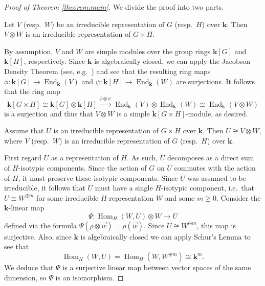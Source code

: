 \documentclass[11pt]{article}
\newenvironment{claim}[1]
 {\renewcommand\theclaimx{#1}\claimx}
 {\endclaimx}
\numberwithin{equation}{section}
\theoremstyle{plain}
\theoremstyle{definition}
\DeclareMathOperator{\Hom}{Hom}
\DeclareMathOperator{\End}{End}
\newcommand\bk{\ensuremath{\mathbf{k}}}
\begin{document}
\begin{proof}[Proof of Theorem \ref{theorem:main}]
We divide the proof into two parts.

\begin{claim}{1}
Let $V$ (resp.\ $W$) be an irreducible representation of $G$ (resp.\ $H$) over $\bk$.  Then
$V \otimes W$ is an irreducible representation of $G \times H$. 
\end{claim}

By assumption, $V$ and $W$ are simple modules over the group rings
$\bk[G]$ and $\bk[H]$, respectively.  
Since $\bk$ is algebraically closed, we can apply the Jacobson Density Theorem 
(see, e.g.\ \cite{PutmanDensity})
and see that the resulting ring maps
$\phi\colon \bk[G] \rightarrow \End_{\bk}(V)$ and $\psi\colon \bk[H] \rightarrow \End_{\bk}(W)$ 
are surjections.  It follows that the ring map
\[\bk[G \times H] \cong \bk[G] \otimes \bk[H] \stackrel{\phi \otimes \psi}{\longrightarrow} \End_{\bk}(V) \otimes \End_{\bk}(W) \cong \End_{\bk}(V \otimes W)\]
is a surjection and thus that $V \otimes W$ is a simple $\bk[G \times H]$-module, as desired.

\begin{claim}{2}
Assume that $U$ is an irreducible representation of $G \times H$ over $\bk$.  
Then $U \cong V \otimes W$, where $V$ (resp.\ $W$) is an irreducible representation
of $G$ (resp.\ $H$) over $\bk$.
\end{claim}

First regard $U$ as a representation of $H$.  As such, $U$ decomposes as a direct sum
of $H$-isotypic components.  Since the action of $G$ on $U$ commutes with the action of $H$, it
must preserve these isotypic components.  Since $U$ was assumed to be irreducible, it follows
that $U$ must have a single $H$-isotypic component, i.e.\ that $U \cong W^{\oplus m}$ for some
irreducible $H$-representation $W$ and some $m \geq 0$.  Consider the $\bk$-linear map
\[\Psi\colon \Hom_H(W,U) \otimes W \rightarrow U\]
defined via the formula $\Psi(\rho \otimes \vec{w}) = \rho(\vec{w})$.  
Since $U \cong W^{\oplus m}$, this
map is surjective.  Also, since $\bk$ is algebraically closed we can apply Schur's Lemma to see
that
\[\Hom_H(W,U) = \Hom_H(W,W^{\oplus m}) \cong \bk^m.\]
We deduce that $\Psi$ is a surjective linear map between vector spaces of the same dimension, 
so $\Psi$ is an isomorphism.


\end{proof}
\end{document}
